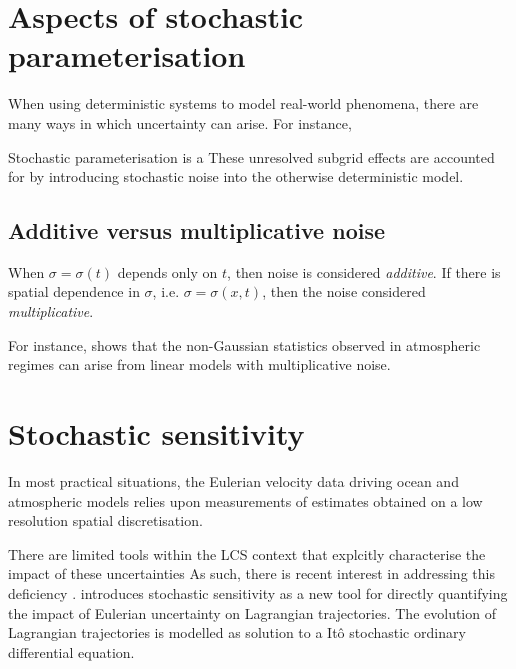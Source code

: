 \section{Aspects of stochastic parameterisation}
When using deterministic systems to model real-world phenomena, there are many ways in which uncertainty can arise.
For instance,

Stochastic parameterisation is a
These unresolved subgrid effects are accounted for by introducing stochastic noise into the otherwise deterministic model.

\citet{BernerEtAl_2017_StochasticParameterizationNew}

\citet{LeutbecherEtAl_2017_StochasticRepresentationsModel}

\subsection{Additive versus multiplicative noise}

When \(\sigma = \sigma(t)\) depends only on \(t\), then noise is considered \emph{additive}.
If there is spatial dependence in \(\sigma\), i.e. \(\sigma = \sigma(x,t)\), then the noise considered \emph{multiplicative}.



For instance, \citet{SuraEtAl_2005_MultiplicativeNoiseNonGaussianity} shows that the non-Gaussian statistics observed in atmospheric regimes can arise from linear models with multiplicative noise.




\section{Stochastic sensitivity}
In most practical situations, the Eulerian velocity data driving ocean and atmospheric models relies upon measurements of estimates obtained on a low resolution spatial discretisation.


There are limited tools within the LCS context that explcitly characterise the impact of these uncertainties
As such, there is recent interest in addressing this deficiency \citep{BalasuriyaGottwald_2018_EstimatingStableUnstablea, Balasuriya_2020_StochasticApproachesLagrangian}.
\citet{Balasuriya_2020_StochasticSensitivityComputable} introduces stochastic sensitivity as a new tool for directly quantifying the impact of Eulerian uncertainty on Lagrangian trajectories.
The evolution of Lagrangian trajectories is modelled as solution to a It\^o stochastic ordinary differential equation.

